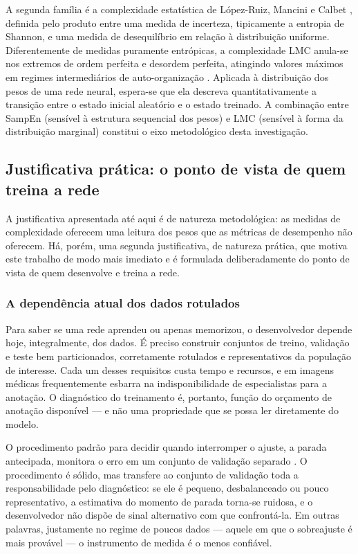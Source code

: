 A segunda família é a complexidade estatística de López-Ruiz, Mancini e
Calbet \cite{lmc1995}, definida pelo produto entre uma medida de
incerteza, tipicamente a entropia de Shannon, e uma medida de
desequilíbrio em relação à distribuição uniforme. Diferentemente de
medidas puramente entrópicas, a complexidade LMC anula-se nos extremos
de ordem perfeita e desordem perfeita, atingindo valores máximos em
regimes intermediários de auto-organização \cite{anteneodo1996}.
Aplicada à distribuição dos pesos de uma rede neural, espera-se que ela
descreva quantitativamente a transição entre o estado inicial aleatório
e o estado treinado. A combinação entre SampEn (sensível à estrutura
sequencial dos pesos) e LMC (sensível à forma da distribuição
marginal) constitui o eixo metodológico desta investigação.

\subsection{Justificativa prática: o ponto de vista de quem treina a rede}
\label{sec:intro-just-dev}

A justificativa apresentada até aqui é de natureza metodológica: as medidas de
complexidade oferecem uma leitura dos pesos que as métricas de desempenho não
oferecem. Há, porém, uma segunda justificativa, de natureza prática, que motiva
este trabalho de modo mais imediato e é formulada deliberadamente do ponto de
vista de quem desenvolve e treina a rede.

\subsubsection*{A dependência atual dos dados rotulados}

Para saber se uma rede aprendeu ou apenas memorizou, o desenvolvedor depende
hoje, integralmente, dos dados. É preciso construir conjuntos de treino,
validação e teste bem particionados, corretamente rotulados e representativos da
população de interesse. Cada um desses requisitos custa tempo e recursos, e em
imagens médicas frequentemente esbarra na indisponibilidade de especialistas
para a anotação. O diagnóstico do treinamento é, portanto, função do orçamento
de anotação disponível --- e não uma propriedade que se possa ler diretamente do
modelo.

O procedimento padrão para decidir quando interromper o ajuste, a parada
antecipada, monitora o erro em um conjunto de validação separado
\cite{prechelt1998}. O procedimento é sólido, mas transfere ao conjunto de
validação toda a responsabilidade pelo diagnóstico: se ele é pequeno,
desbalanceado ou pouco representativo, a estimativa do momento de parada
torna-se ruidosa, e o desenvolvedor não dispõe de sinal alternativo com que
confrontá-la. Em outras palavras, justamente no regime de poucos dados ---
aquele em que o sobreajuste é mais provável --- o instrumento de medida é o
menos confiável.

